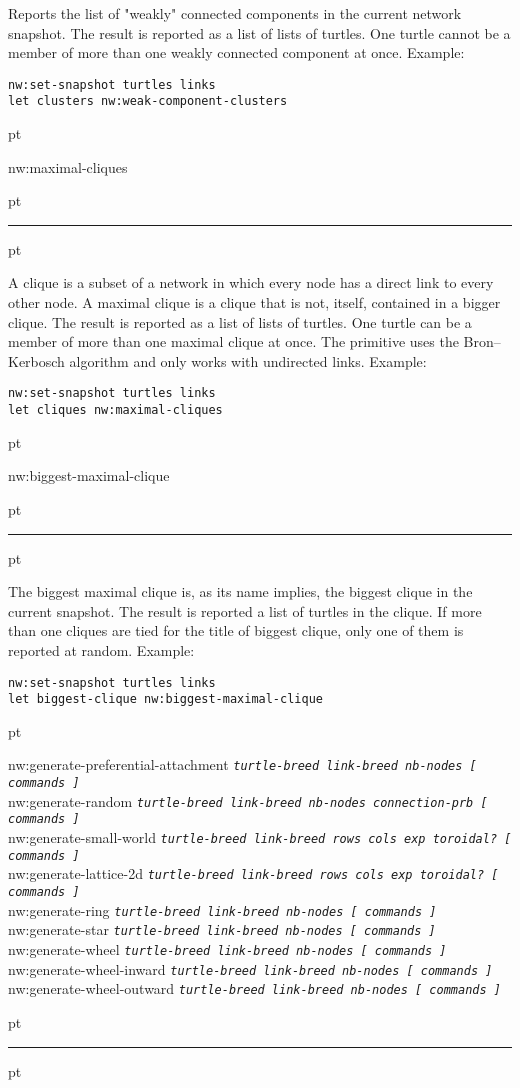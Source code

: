 \documentclass[10pt]{article}
\newenvironment{prim}{
  \leftskip 0cm
  \vskip 6 pt
  \ttfamily
  \bfseries
}{
  \vskip 2 pt
  \hrule
  \vskip 6 pt
}
\newcommand{\param}[1]{\texttt{\textit{\textmd{#1}}}}
\newcommand{\cat}[1]{\vspace{1 em}{\parindent -1cm \scshape \bfseries \large
#1}}
\begin{document}
Reports the list of "weakly" connected components in the current network
snapshot. The result is reported as a list of lists of turtles. One turtle
cannot be a member of more than one weakly connected component at once.
Example:

\begin{Verbatim}
nw:set-snapshot turtles links
let clusters nw:weak-component-clusters
\end{Verbatim}

\begin{prim}
nw:maximal-cliques
\end{prim}

A clique is a subset of a network in which every node has a direct link to every
other node. A maximal clique is a clique that is not, itself, contained in a
bigger clique. The result is reported as a list of lists of turtles. One turtle can be a member of more than one maximal clique at once. The
primitive uses the Bron–Kerbosch algorithm and only works with undirected links.
Example:
\begin{Verbatim}
nw:set-snapshot turtles links
let cliques nw:maximal-cliques
\end{Verbatim}

\pagebreak

\begin{prim}
nw:biggest-maximal-clique
\end{prim}

The biggest maximal clique is, as its name implies, the biggest clique in the
current snapshot. The result is reported a list of turtles in the clique. If
more than one cliques are tied for the title of biggest clique, only one of them
is reported at random. Example:

\begin{Verbatim}
nw:set-snapshot turtles links
let biggest-clique nw:biggest-maximal-clique
\end{Verbatim}

\cat{Generator Primitives}

\begin{prim}
nw:generate-preferential-attachment
\param{turtle-breed link-breed nb-nodes [ commands ]}\\
nw:generate-random
\param{turtle-breed link-breed nb-nodes connection-prb [ commands ]}\\
nw:generate-small-world
\param{turtle-breed link-breed rows cols exp toroidal? [ commands ]}\\
nw:generate-lattice-2d
\param{turtle-breed link-breed rows cols exp toroidal? [ commands ]}\\
nw:generate-ring
\param{turtle-breed link-breed nb-nodes [ commands ]}\\
nw:generate-star
\param{turtle-breed link-breed nb-nodes [ commands ]}\\
nw:generate-wheel
\param{turtle-breed link-breed nb-nodes [ commands ]}\\
nw:generate-wheel-inward
\param{turtle-breed link-breed nb-nodes [ commands ]}\\
nw:generate-wheel-outward
\param{turtle-breed link-breed nb-nodes [ commands ]}
\end{prim}
\end{document}
